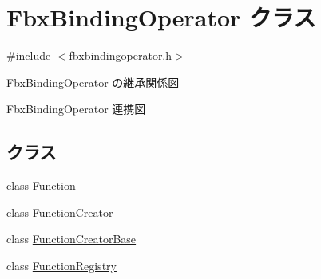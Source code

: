 \hypertarget{class_fbx_binding_operator}{}\section{Fbx\+Binding\+Operator クラス}
\label{class_fbx_binding_operator}


{\ttfamily \#include $<$fbxbindingoperator.\+h$>$}



Fbx\+Binding\+Operator の継承関係図


Fbx\+Binding\+Operator 連携図
\subsection*{クラス}
\begin{DoxyCompactItemize}
\item 
class \hyperlink{class_fbx_binding_operator_1_1_function}{Function}
\item 
class \hyperlink{class_fbx_binding_operator_1_1_function_creator}{Function\+Creator}
\item 
class \hyperlink{class_fbx_binding_operator_1_1_function_creator_base}{Function\+Creator\+Base}
\item 
class \hyperlink{class_fbx_binding_operator_1_1_function_registry}{Function\+Registry}
\end{DoxyCompactItemize}

